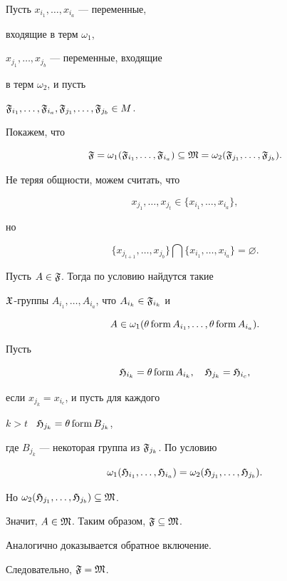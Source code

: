 \begin{pf}


Пусть $x_{i_1},\dotsc,x_{i_a}$ --- переменные,


входящие в терм $\omega_1$,


$x_{j_1},\dotsc,x_{j_b}$ --- переменные, входящие


в терм $\omega_2$, и пусть


$\frak{F}_{i_1},\dotsc,\frak{F}_{i_a},


\frak{F}_{j_1},\dotsc,\frak{F}_{j_b}\in M$.


Покажем, что


$$


\frak{F}=\omega_1(\frak{F}_{i_1},\dotsc,\frak{F}_{i_a})\subseteq


\frak{M}=\omega_2(\frak{F}_{j_1},\dotsc,\frak{F}_{j_b}).


$$


Не теряя общности, можем считать, что


$$


x_{j_1},\dotsc,x_{j_t}\in\{x_{i_1},\dotsc,x_{i_a}\},


$$


но


$$


\{x_{j_{t+1}},\dotsc,x_{j_b}\}\bigcap\{x_{i_1},\dotsc,x_{i_a}\}=\varnothing.


$$


Пусть $A\in\frak{F}$. Тогда по условию найдутся такие


$\frak{X}$-группы $A_{i_1},\dotsc,A_{i_a}$, что $A_{i_k}\in\frak{F}_{i_k}$ и


$$


A\in\omega_1(\theta\form A_{i_1},\dotsc,\theta\form A_{i_a}).


$$


Пусть


$$


\frak{H}_{i_k}=\theta\form A_{i_k},\quad


\frak{H}_{j_k}=\frak{H}_{i_c},


$$


если $x_{j_k}=x_{i_c}$, и пусть для каждого


$k>t$ \ $\frak{H}_{j_k}=\theta\operatorname{form} B_{j_k}$,


где $B_{j_k}$ --- некоторая группа из $\frak{F}_{j_k}$. По условию


$$


\omega_1(\frak{H}_{i_1},\dotsc,\frak{H}_{i_a})=


\omega_2(\frak{H}_{j_1},\dotsc,\frak{H}_{j_b}).


$$


Но $\omega_2(\frak{H}_{j_1},\dotsc,\frak{H}_{j_b})\subseteq\frak{M}$.


Значит, $A\in\frak{M}$. Таким образом, $\frak{F}\subseteq\frak{M}$.


Аналогично доказывается обратное включение.


Следовательно, $\frak{F}=\frak{M}$.


\end{pf}





